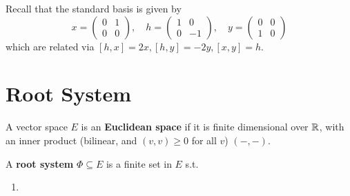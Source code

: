 \documentclass{article}
\begin{document}
Recall that the standard basis is given by
\[
    x = \begin{pmatrix}
        0 & 1 \\ 0 & 0     
    \end{pmatrix}, \quad
    h = \begin{pmatrix}
        1 & 0 \\ 0 & -1
    \end{pmatrix}, \quad
    y = \begin{pmatrix}
        0 & 0 \\ 1 & 0
    \end{pmatrix}
\]
which are related via $[h, x] = 2x, [h, y] = -2y, [x, y] = h$.

\section{Root System}

\begin{definition}
    A vector space $E$ is an \textbf{Euclidean space} if it is finite dimensional over $\mathbb{R}$, with an inner product (bilinear, and $(v, v) \geq 0$ for all $v$) $(-, -)$.
\end{definition}

\begin{definition}
    A \textbf{root system} $\Phi \subseteq E$ is a finite set in $E$ s.t.
    \begin{enumerate}
        \item 
    \end{enumerate}
\end{definition}
\end{document}
